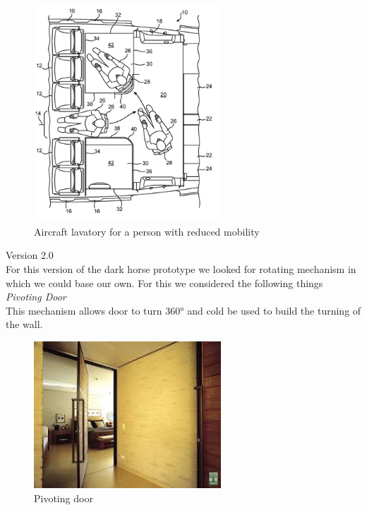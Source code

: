 \begin{figure}[h]
\centering
\includegraphics[width=7cm]{brazil_images/image017.png}
\caption{Aircraft lavatory for a person with reduced mobility}
\label{fig:aircraft_lavatory}
\end{figure}


\noindent Version 2.0 \\

For this version of the dark horse prototype we looked for rotating mechanism in which we could base our own. For this we considered the following things\\

\noindent\emph{Pivoting Door}\\
 This mechanism allows door to turn 360° and cold be used to build the turning of the wall.\\

\begin{figure}[h]
\centering
\includegraphics[width=7cm]{brazil_images/image018.jpg}
\caption{Pivoting door} %
\label{fig:pivoting_door}
\end{figure}


